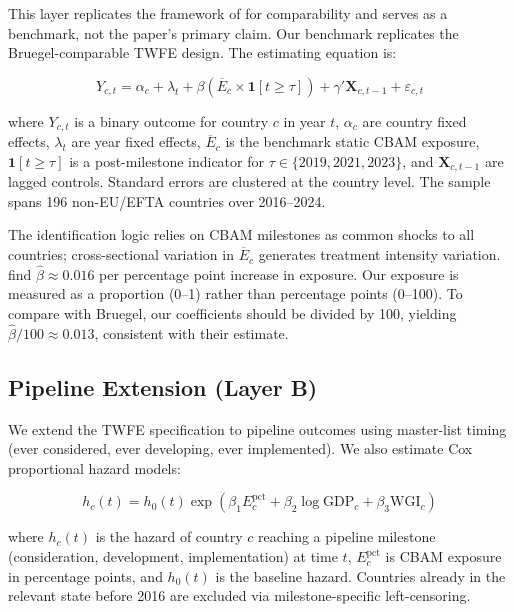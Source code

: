 \documentclass[12pt,a4paper]{article}
\begin{document}
This layer replicates the framework of \citet{Bahi2026} for comparability and serves as a benchmark, not the paper's primary claim. Our benchmark replicates the Bruegel-comparable TWFE design. The estimating equation is:

\begin{equation}
Y_{c,t} = \alpha_c + \lambda_t + \beta \left( \overline{E}_c \times \mathbf{1}[t \geq \tau] \right) + \gamma' \mathbf{X}_{c,t-1} + \varepsilon_{c,t}
\label{eq:benchmark}
\end{equation}

\noindent where $Y_{c,t}$ is a binary outcome for country $c$ in year $t$, $\alpha_c$ are country fixed effects, $\lambda_t$ are year fixed effects, $\overline{E}_c$ is the benchmark static CBAM exposure, $\mathbf{1}[t \geq \tau]$ is a post-milestone indicator for $\tau \in \{2019, 2021, 2023\}$, and $\mathbf{X}_{c,t-1}$ are lagged controls. Standard errors are clustered at the country level. The sample spans 196 non-EU/EFTA countries over 2016--2024.

The identification logic relies on CBAM milestones as common shocks to all countries; cross-sectional variation in $\overline{E}_c$ generates treatment intensity variation. \citet{Bahi2026} find $\hat{\beta} \approx 0.016$ per percentage point increase in exposure. Our exposure is measured as a proportion (0--1) rather than percentage points (0--100). To compare with Bruegel, our coefficients should be divided by 100, yielding $\hat{\beta}/100 \approx 0.013$, consistent with their estimate.

\subsection{Pipeline Extension (Layer B)}\label{sec:pipeline_spec}

We extend the TWFE specification to pipeline outcomes using master-list timing (ever considered, ever developing, ever implemented). We also estimate Cox proportional hazard models:

\begin{equation}
h_c(t) = h_0(t) \exp\left( \beta_1 E_c^{\text{pct}} + \beta_2 \log \text{GDP}_{c} + \beta_3 \text{WGI}_{c} \right)
\label{eq:cox}
\end{equation}

\noindent where $h_c(t)$ is the hazard of country $c$ reaching a pipeline milestone (consideration, development, implementation) at time $t$, $E_c^{\text{pct}}$ is CBAM exposure in percentage points, and $h_0(t)$ is the baseline hazard. Countries already in the relevant state before 2016 are excluded via milestone-specific left-censoring.
\end{document}
